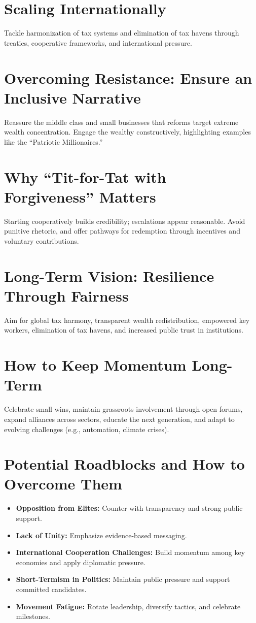 \section{Scaling Internationally}
Tackle harmonization of tax systems and elimination of tax havens through treaties, cooperative frameworks, and international pressure.

\section{Overcoming Resistance: Ensure an Inclusive Narrative}
Reassure the middle class and small businesses that reforms target extreme wealth concentration. Engage the wealthy constructively, highlighting examples like the ``Patriotic Millionaires.''

\section{Why ``Tit-for-Tat with Forgiveness'' Matters}
Starting cooperatively builds credibility; escalations appear reasonable. Avoid punitive rhetoric, and offer pathways for redemption through incentives and voluntary contributions.

\section{Long-Term Vision: Resilience Through Fairness}
Aim for global tax harmony, transparent wealth redistribution, empowered key workers, elimination of tax havens, and increased public trust in institutions.

\section{How to Keep Momentum Long-Term}
Celebrate small wins, maintain grassroots involvement through open forums, expand alliances across sectors, educate the next generation, and adapt to evolving challenges (e.g., automation, climate crises).

\section{Potential Roadblocks and How to Overcome Them}
\begin{itemize}
  \item \textbf{Opposition from Elites:} Counter with transparency and strong public support.
  \item \textbf{Lack of Unity:} Emphasize evidence-based messaging.
  \item \textbf{International Cooperation Challenges:} Build momentum among key economies and apply diplomatic pressure.
  \item \textbf{Short-Termism in Politics:} Maintain public pressure and support committed candidates.
  \item \textbf{Movement Fatigue:} Rotate leadership, diversify tactics, and celebrate milestones.
\end{itemize}

